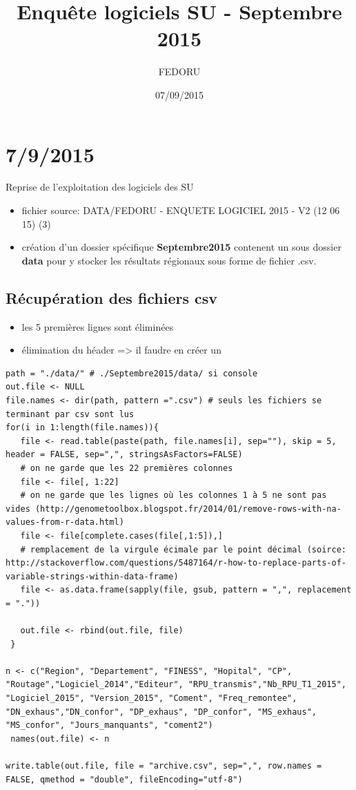 \documentclass[]{article}
\title{Enquête logiciels SU - Septembre 2015}
\author{FEDORU}
\date{07/09/2015}
\begin{document}
\maketitle


{
\hypersetup{linkcolor=black}
\setcounter{tocdepth}{2}
\tableofcontents
}
\section{7/9/2015}\label{section}

Reprise de l'exploitation des logiciels des SU

\begin{itemize}
\itemsep1pt\parskip0pt
\item
  fichier source: DATA/FEDORU - ENQUETE LOGICIEL 2015 - V2 (12 06 15)
  (3)
\item
  création d'un dossier spécifique \textbf{Septembre2015} contenent un
  sous dossier \textbf{data} pour y stocker les résultats régionaux sous
  forme de fichier .csv.
\end{itemize}

\subsection{Récupération des fichiers
csv}\label{recuperation-des-fichiers-csv}

\begin{itemize}
\itemsep1pt\parskip0pt
\item
  les 5 premières lignes sont éliminées
\item
  élimination du héader =\textgreater{} il faudre en créer un
\end{itemize}

\begin{verbatim}
path = "./data/" # ./Septembre2015/data/ si console
out.file <- NULL
file.names <- dir(path, pattern =".csv") # seuls les fichiers se terminant par csv sont lus
for(i in 1:length(file.names)){
   file <- read.table(paste(path, file.names[i], sep=""), skip = 5, header = FALSE, sep=",", stringsAsFactors=FALSE)
   # on ne garde que les 22 premières colonnes
   file <- file[, 1:22]
   # on ne garde que les lignes où les colonnes 1 à 5 ne sont pas vides (http://genometoolbox.blogspot.fr/2014/01/remove-rows-with-na-values-from-r-data.html)
   file <- file[complete.cases(file[,1:5]),]
   # remplacement de la virgule écimale par le point décimal (soirce: http://stackoverflow.com/questions/5487164/r-how-to-replace-parts-of-variable-strings-within-data-frame)
   file <- as.data.frame(sapply(file, gsub, pattern = ",", replacement = "."))

   out.file <- rbind(out.file, file)
 }

n <- c("Region", "Departement", "FINESS", "Hopital", "CP", "Routage","Logiciel_2014","Editeur", "RPU_transmis","Nb_RPU_T1_2015", "Logiciel_2015", "Version_2015", "Coment", "Freq_remontee", "DN_exhaus","DN_confor", "DP_exhaus", "DP_confor", "MS_exhaus", "MS_confor", "Jours_manquants", "coment2")
 names(out.file) <- n

write.table(out.file, file = "archive.csv", sep=",", row.names = FALSE, qmethod = "double", fileEncoding="utf-8")
\end{verbatim}
\end{document}
